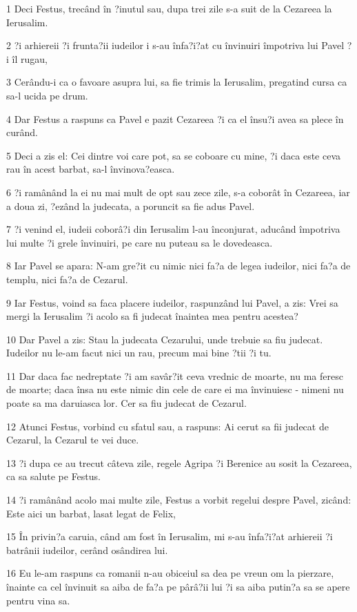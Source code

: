 \par 1 Deci Festus, trecând în ?inutul sau, dupa trei zile s-a suit de la Cezareea la Ierusalim.
\par 2 ?i arhiereii ?i frunta?ii iudeilor i s-au înfa?i?at cu învinuiri împotriva lui Pavel ?i îl rugau,
\par 3 Cerându-i ca o favoare asupra lui, sa fie trimis la Ierusalim, pregatind cursa ca sa-l ucida pe drum.
\par 4 Dar Festus a raspuns ca Pavel e pazit Cezareea ?i ca el însu?i avea sa plece în curând.
\par 5 Deci a zis el: Cei dintre voi care pot, sa se coboare cu mine, ?i daca este ceva rau în acest barbat, sa-l învinova?easca.
\par 6 ?i ramânând la ei nu mai mult de opt sau zece zile, s-a coborât în Cezareea, iar a doua zi, ?ezând la judecata, a poruncit sa fie adus Pavel.
\par 7 ?i venind el, iudeii coborâ?i din Ierusalim l-au înconjurat, aducând împotriva lui multe ?i grele învinuiri, pe care nu puteau sa le dovedeasca.
\par 8 Iar Pavel se apara: N-am gre?it cu nimic nici fa?a de legea iudeilor, nici fa?a de templu, nici fa?a de Cezarul.
\par 9 Iar Festus, voind sa faca placere iudeilor, raspunzând lui Pavel, a zis: Vrei sa mergi la Ierusalim ?i acolo sa fi judecat înaintea mea pentru acestea?
\par 10 Dar Pavel a zis: Stau la judecata Cezarului, unde trebuie sa fiu judecat. Iudeilor nu le-am facut nici un rau, precum mai bine ?tii ?i tu.
\par 11 Dar daca fac nedreptate ?i am savâr?it ceva vrednic de moarte, nu ma feresc de moarte; daca însa nu este nimic din cele de care ei ma învinuiesc - nimeni nu poate sa ma daruiasca lor. Cer sa fiu judecat de Cezarul.
\par 12 Atunci Festus, vorbind cu sfatul sau, a raspuns: Ai cerut sa fii judecat de Cezarul, la Cezarul te vei duce.
\par 13 ?i dupa ce au trecut câteva zile, regele Agripa ?i Berenice au sosit la Cezareea, ca sa salute pe Festus.
\par 14 ?i ramânând acolo mai multe zile, Festus a vorbit regelui despre Pavel, zicând: Este aici un barbat, lasat legat de Felix,
\par 15 În privin?a caruia, când am fost în Ierusalim, mi s-au înfa?i?at arhiereii ?i batrânii iudeilor, cerând osândirea lui.
\par 16 Eu le-am raspuns ca romanii n-au obiceiul sa dea pe vreun om la pierzare, înainte ca cel învinuit sa aiba de fa?a pe pârâ?ii lui ?i sa aiba putin?a sa se apere pentru vina sa.
